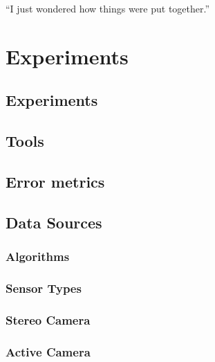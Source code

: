\begin{savequote}[8cm]
  ``I just wondered how things were put together.''
\end{savequote}
\makeatletter
\chapter{Experiments}
\label{ch:Experiments}

\section{Experiments}


\section{Tools}
\label{ToolsSection}


\section{Error metrics}
\label{metricsSection}


\section{Data Sources}
\label{Sec:FVRSOTA}
\subsection{Algorithms} 
\label{AlgorithmsSection}


\subsection{Sensor Types} 
\label{SensorTypesExpsSection}


\subsection{Stereo Camera}
\label{StereoSOTA}


\subsection{Active Camera}
\label{ActiveSOTA}



